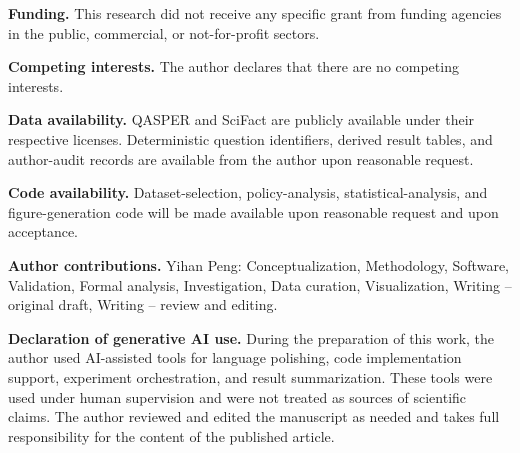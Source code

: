 \documentclass[smallextended]{svjour3}
\begin{document}
\noindent\textbf{Funding.} This research did not receive any specific grant from funding agencies in the public, commercial, or not-for-profit sectors.\par
\noindent\textbf{Competing interests.} The author declares that there are no competing interests.\par
\noindent\textbf{Data availability.} QASPER and SciFact are publicly available under their respective licenses. Deterministic question identifiers, derived result tables, and author-audit records are available from the author upon reasonable request.\par
\noindent\textbf{Code availability.} Dataset-selection, policy-analysis, statistical-analysis, and figure-generation code will be made available upon reasonable request and upon acceptance.\par
\noindent\textbf{Author contributions.} Yihan Peng: Conceptualization, Methodology, Software, Validation, Formal analysis, Investigation, Data curation, Visualization, Writing -- original draft, Writing -- review and editing.\par
\noindent\textbf{Declaration of generative AI use.} During the preparation of this work, the author used AI-assisted tools for language polishing, code implementation support, experiment orchestration, and result summarization. These tools were used under human supervision and were not treated as sources of scientific claims. The author reviewed and edited the manuscript as needed and takes full responsibility for the content of the published article.



    
\end{document}
